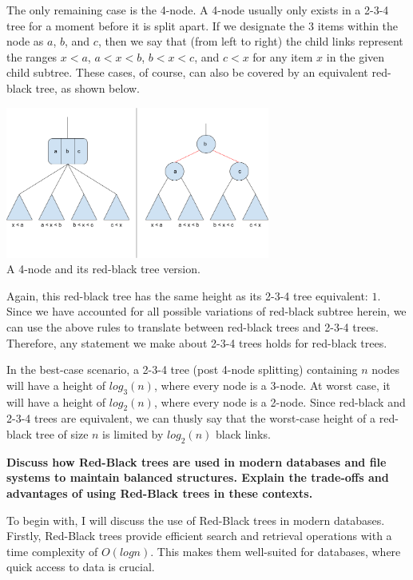 \documentclass[12pt]{amsart}
\begin{document}
    The only remaining case is the 4-node. A 4-node usually only
    exists in a 2-3-4 tree for a moment before it is split
    apart. If we designate the $3$ items within the node as
    $a$, $b$, and $c$, then we say that (from left to right) the
    child links represent the ranges $x < a$, $a < x < b$,
    $b < x < c$, and $c < x$ for any item $x$ in the given
    child subtree. These cases, of course, can also be covered
    by an equivalent red-black tree, as shown below.

\begin{center}
    \includegraphics[width=0.65\textwidth]{rb_tree_2} \\
    A 4-node and its red-black tree version. \\
    \vskip 1cm
\end{center}

    Again, this red-black tree has the same height as its 2-3-4
    tree equivalent: $1$. Since we have accounted for all
    possible variations of red-black subtree herein, we can use
    the above rules to translate between red-black trees and
    2-3-4 trees. Therefore, any statement we make about 2-3-4
    trees holds for red-black trees.

    In the best-case scenario, a 2-3-4 tree (post 4-node
    splitting) containing $n$ nodes will have a height of
    $log_3(n)$, where every node is a 3-node. At worst case, it
    will have a height of $log_2(n)$, where every node is a
    2-node. Since red-black and 2-3-4 trees are equivalent, we
    can thusly say that the worst-case height of a red-black
    tree of size $n$ is limited by $log_2(n)$ black links.

    \newpage
    \textbf{Discuss how Red-Black trees are used in modern
    databases and file systems to maintain balanced structures.
    Explain the trade-offs and advantages of using Red-Black
    trees in these contexts.}

    To begin with, I will discuss the use of Red-Black trees in
    modern databases. Firstly, Red-Black trees provide efficient
    search and retrieval operations with a time complexity of
    $O(log n)$. This makes them well-suited for databases, where
    quick access to data is crucial.
    
\end{document}

